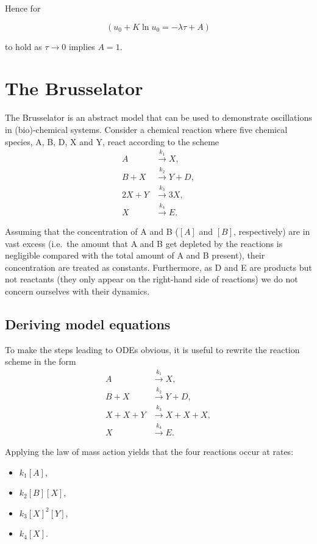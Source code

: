 \documentclass[
  letterpaper,
  DIV=11,
  numbers=noendperiod]{scrreprt}
\providecommand{\tightlist}{%
  \setlength{\itemsep}{0pt}\setlength{\parskip}{0pt}}
\begin{document}
Hence for

\[
 (u_0+K\ln u_0=-\lambda \tau +A)
\]

to hold as \(\tau \rightarrow 0\) implies \(A=1\).

\section{The Brusselator}\label{the-brusselator}

The Brusselator is an abstract model that can be used to demonstrate
oscillations in (bio)-chemical systems. Consider a chemical reaction
where five chemical species, A, B, D, X and Y, react according to the
scheme \[
\begin{aligned}
A&\xrightarrow{k_{1}} X,  \nonumber \\
B+X&\xrightarrow{k_{2}} Y+D, \nonumber\\
2X+Y&\xrightarrow{k_{3}} 3X, \nonumber\\
X&\xrightarrow{k_{4}} E. 
\end{aligned}
\]

Assuming that the concentration of A and B (\([A]\) and \([B]\),
respectively) are in vast excess (i.e.~the amount that A and B get
depleted by the reactions is negligible compared with the total amount
of A and B present), their concentration are treated as constants.
Furthermore, as D and E are products but not reactants (they only appear
on the right-hand side of reactions) we do not concern ourselves with
their dynamics.

\subsection{Deriving model equations}\label{deriving-model-equations}

To make the steps leading to ODEs obvious, it is useful to rewrite the
reaction scheme in the form \[
 \begin{aligned}
A&\xrightarrow{k_{1}} X,  \nonumber \\
B+X&\xrightarrow{k_{2}} Y+D, \nonumber\\
X+X+Y&\xrightarrow{k_{3}} X+X+X, \nonumber\\
X&\xrightarrow{k_{4}} E. 
\end{aligned}
\]

Applying the law of mass action yields that the four reactions occur at
rates:

\begin{itemize}
\tightlist
\item
  \(k_1[A]\),
\item
  \(k_2[B][X]\),
\item
  \(k_3[X]^2[Y]\),
\item
  \(k_4[X]\).
\end{itemize}
\end{document}
